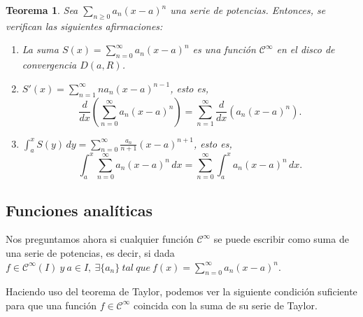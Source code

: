 \documentclass[11pt, a4paper]{article}
\theoremstyle{theorem-style}
\newtheorem{nth}{Teorema}[section]
\theoremstyle{definition-style}
\theoremstyle{remark-style}
\theoremstyle{example-style}
\newenvironment{nlist}
{\begin{enumerate}
\renewcommand\labelenumi{(\emph{\roman{enumi})}}}
{\end{enumerate}}
\begin{document}
\begin{nth} \label{14}
Sea $\displaystyle\sum_{n\geq 0} a_n (x-a)^n$ una serie de potencias. Entonces, se verifican las siguientes afirmaciones:	
\begin{nlist}
	\item La suma $S(x)=\displaystyle\sum_{n= 0}^\infty a_n (x-a)^n$ es una función $\mathcal{C}^\infty$ en el disco de convergencia $D(a,R)$.
\item $S'(x)= \displaystyle\sum_{n= 1}^\infty n a_n (x-a)^{n-1}$, esto es,
\[
\displaystyle\frac{d}{dx} \left( \sum_{n= 0}^\infty a_n (x-a)^n \right) =  \sum_{n= 1}^\infty \frac{d}{dx} \left( a_n (x-a)^n \right) .
\]
\item 
$\displaystyle \int_a^x S(y)\, dy =   \sum_{n= 0}^\infty \frac{a_n}{n+1} (x-a)^{n+1}$, esto es,
\[
\int_a^x  \sum_{n= 0}^\infty a_n (x-a)^n \, dx 
=  \sum_{n= 0}^\infty \int_a^x a_n (x-a)^n \, dx.
\]
\end{nlist}

\end{nth}



\subsection{Funciones analíticas}

Nos preguntamos ahora si cualquier función $\mathcal{C}^{\infty}$ se puede escribir como suma de una serie de potencias, es decir, si dada $f \in \mathcal{C}^{\infty}(I)\ y\ a \in I, \ \exists \{a_n\}\ tal\ que\ f(x) = \sum_{n=0}^{\infty}a_n(x-a)^n$.


Haciendo uso del teorema de Taylor, podemos ver la siguiente condici\'on suficiente para que una funci\'on $f\in \mathcal{C}^\infty$ coincida con la suma de su serie de Taylor.
\end{document}
